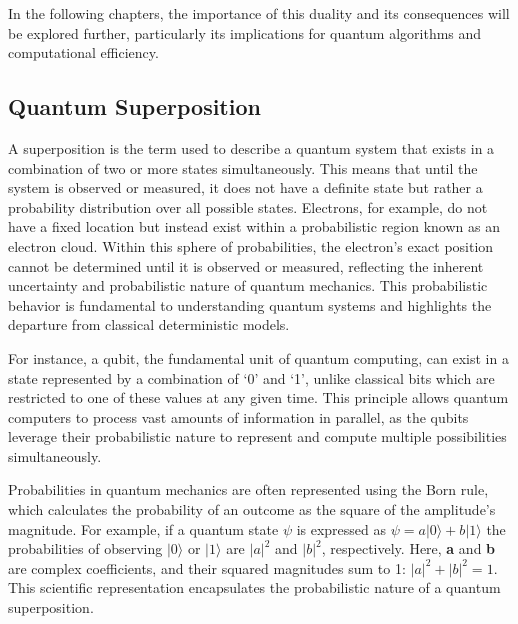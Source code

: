 \documentclass{report}
\begin{document}
In the following chapters, the importance of this duality and its consequences will be explored further, particularly its implications for quantum algorithms and computational efficiency.
\cite{photonterraceWaveparticleDuality}
\cite{Quantum101yt}
\cite{wavedualityyt}
\cite{physicsminute}
\cite{QuantumLeaps}

 
 

\subsection{Quantum Superposition}
\label{quantum-superposition}
A superposition is the term used to describe a quantum system that exists in a combination of two or more states simultaneously. This means that until the system is observed or measured, it does not have a definite state but rather a probability distribution over all possible states. Electrons, for example, do not have a fixed location but instead exist within a probabilistic region known as an electron cloud. Within this sphere of probabilities, the electron’s exact position cannot be determined until it is observed or measured, reflecting the inherent uncertainty and probabilistic nature of quantum mechanics. This probabilistic behavior is fundamental to understanding quantum systems and highlights the departure from classical deterministic models.

For instance, a qubit, the fundamental unit of quantum computing, can exist in a state represented by a combination of ‘0’ and ‘1’, unlike classical bits which are restricted to one of these values at any given time. This principle allows quantum computers to process vast amounts of information in parallel, as the qubits leverage their probabilistic nature to represent and compute multiple possibilities simultaneously.

Probabilities in quantum mechanics are often represented using the Born rule, which calculates the probability of an outcome as the square of the amplitude's magnitude. For example, if a quantum state \(\psi\) is expressed as \(\psi=a|0\rangle+b|1\rangle \) the probabilities of observing \(|0\rangle\) or \(|1\rangle\) are \(|a|^2\) and \(|b|^2\), respectively. Here, \textbf{a} and \textbf{b} are complex coefficients, and their squared magnitudes sum to 1: \(|a|^2+|b|^2=1\). This scientific representation encapsulates the probabilistic nature of a quantum superposition.

 \cite{wikipediaDoubleslitExperiment}
\cite{umdQuantumSuperposition}
 
\end{document}
